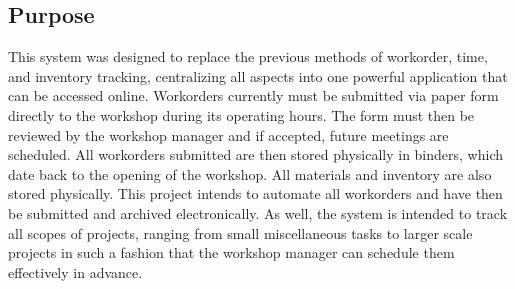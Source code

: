 \subsection{Purpose}
This system was designed to replace the previous methods of workorder, time, and inventory tracking, centralizing all aspects into one powerful application that can be accessed online. Workorders currently must be submitted via paper form directly to the workshop during its operating hours. The form must then be reviewed by the workshop manager and if accepted, future meetings are scheduled. All workorders submitted are then stored physically in binders, which date back to the opening of the workshop. All materials and inventory are also stored physically. This project intends to automate all workorders and have then be submitted and archived electronically. As well, the system is intended to track all scopes of projects, ranging from small miscellaneous tasks to larger scale projects in such a fashion that the workshop manager can schedule them effectively in advance. 
